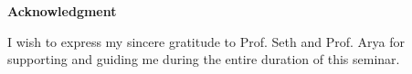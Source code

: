 \newpage
\vspace*{0.75in}
\label{pg:ack}
\begin{center} {\bf \Huge Acknowledgment}\\[0.5in] \end{center}
{\normalsize I wish to express my sincere gratitude to Prof. Seth and Prof. Arya for supporting
and guiding me during the entire duration of this seminar.}\\

